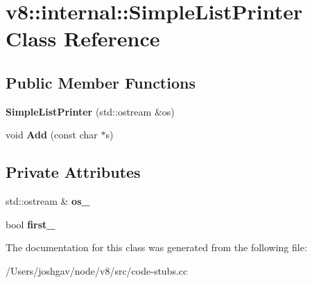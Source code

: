 \hypertarget{classv8_1_1internal_1_1_simple_list_printer}{}\section{v8\+:\+:internal\+:\+:Simple\+List\+Printer Class Reference}
\label{classv8_1_1internal_1_1_simple_list_printer}
\subsection*{Public Member Functions}
\begin{DoxyCompactItemize}
\item 
{\bfseries Simple\+List\+Printer} (std\+::ostream \&os)\hypertarget{classv8_1_1internal_1_1_simple_list_printer_a40201fa1bda3e3ac263df2ee7cd15eca}{}\label{classv8_1_1internal_1_1_simple_list_printer_a40201fa1bda3e3ac263df2ee7cd15eca}

\item 
void {\bfseries Add} (const char $\ast$s)\hypertarget{classv8_1_1internal_1_1_simple_list_printer_aeca9e360c2ea02e770f36878320a4d42}{}\label{classv8_1_1internal_1_1_simple_list_printer_aeca9e360c2ea02e770f36878320a4d42}

\end{DoxyCompactItemize}
\subsection*{Private Attributes}
\begin{DoxyCompactItemize}
\item 
std\+::ostream \& {\bfseries os\+\_\+}\hypertarget{classv8_1_1internal_1_1_simple_list_printer_a3b4344027141ca1389ec477895e01da8}{}\label{classv8_1_1internal_1_1_simple_list_printer_a3b4344027141ca1389ec477895e01da8}

\item 
bool {\bfseries first\+\_\+}\hypertarget{classv8_1_1internal_1_1_simple_list_printer_a66d8c341047423efe86f32b917618909}{}\label{classv8_1_1internal_1_1_simple_list_printer_a66d8c341047423efe86f32b917618909}

\end{DoxyCompactItemize}


The documentation for this class was generated from the following file\+:\begin{DoxyCompactItemize}
\item 
/\+Users/joshgav/node/v8/src/code-\/stubs.\+cc\end{DoxyCompactItemize}
